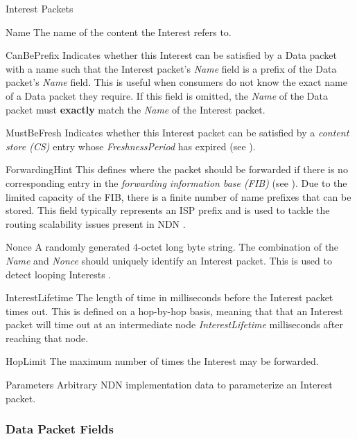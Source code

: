 \begin{labeling}{Interest Packets }
    \item [Name] The name of the content the Interest refers to.
    \item [CanBePrefix] Indicates whether this Interest can be satisfied by a Data packet with a name such that the Interest packet's \textit{Name} field is a prefix of the Data packet's \textit{Name} field. This is useful when consumers do not know the exact name of a Data packet they require. If this field is omitted, the \textit{Name} of the Data packet must \textbf{exactly} match the \textit{Name} of the Interest packet. 
    \item [MustBeFresh] Indicates whether this Interest packet can be satisfied by a \textit{content store (CS)} entry whose \textit{FreshnessPeriod} has expired (see ).
    \item [ForwardingHint] This defines where the packet should be forwarded if there is no corresponding entry in the \textit{forwarding information base (FIB)} (see ). Due to the limited capacity of the FIB, there is a finite number of name prefixes that can be stored. This field typically represents an ISP prefix and is used to tackle the routing scalability issues present in NDN \cite{ndn-forwarding-hint}\cite{ndn-dns}.
    \item [Nonce] A randomly generated 4-octet long byte string. The combination of the \textit{Name} and \textit{Nonce} should uniquely identify an Interest packet. This is used to detect looping Interests \cite{ndn-packet-spec}.
    \item [InterestLifetime] The length of time in milliseconds before the Interest packet times out. This is defined on a hop-by-hop basis, meaning that that an Interest packet will time out at an intermediate node \textit{InterestLifetime} milliseconds after reaching that node.
    \item [HopLimit] The maximum number of times the Interest may be forwarded.
    \item [Parameters] Arbitrary NDN implementation data to parameterize an Interest packet.
\end{labeling}

\vspace{5mm}
\subsubsection{Data Packet Fields}

